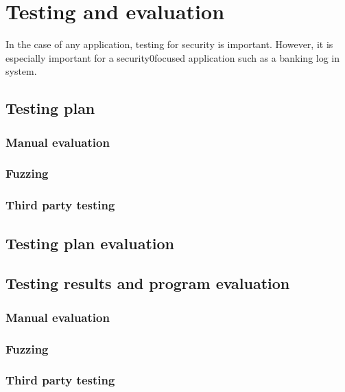 \section{Testing and evaluation}

In the case of any application, testing for security is important. However, it is especially important for a security0focused application such as a banking log in system. 

\subsection{Testing plan}



\subsubsection{Manual evaluation}



\subsubsection{Fuzzing}



\subsubsection{Third party testing}



\subsection{Testing plan evaluation}



\subsection{Testing results and program evaluation}



\subsubsection{Manual evaluation}



\subsubsection{Fuzzing}



\subsubsection{Third party testing}

